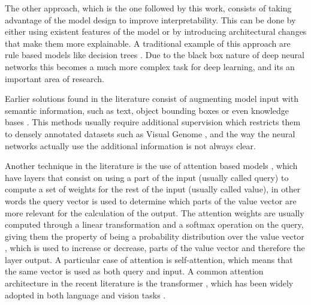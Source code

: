 The other approach, which is the one followed by this work, consists of taking advantage of the model
design to improve interpretability. This can be done by either using existent features of the model
or by introducing architectural changes that make them more explainable. A traditional  example of
this approach are rule based models like  decision trees \cite{breiman_tree}. Due to the black box
nature of deep neural networks this becomes a much more complex task for deep learning, and its an
important area of research.

Earlier solutions found in the literature consist of augmenting
model input with semantic information, such as text, object bounding boxes or even knowledge bases
\cite{dong_semantic, zhuo_video, li_knowledge}. This methods usually require additional supervision
which restricts them to densely annotated datasets such as Visual Genome \cite{krishna_visualgenome},
and the way the neural networks actually  use the additional information is not always clear.

Another technique in the literature is the use of attention based models \cite{bahdanau_attention},
which have layers that consist on using a part of the input (usually called query) to compute a set of weights
for the rest of the input (usually called value), in other words the query vector is used
to determine which parts of the value vector are more relevant for the calculation of the output.
The attention weights are usually computed through
a linear transformation and a softmax operation on the query, giving them the property of being a probability
distribution over the value vector \cite{cordonnier_relationship}, which is used to increase or decrease,
parts of the value vector and therefore the layer output. A particular case of attention is
self-attention, which means that the same vector is used as both query and input. A common attention architecture
in the recent literature is the transformer \cite{vaswani_attention}, which has been widely adopted in both
language and vision tasks \cite{devlin_bert, radford_gpt, bello_attention, li_visualbert, carion_object}.

